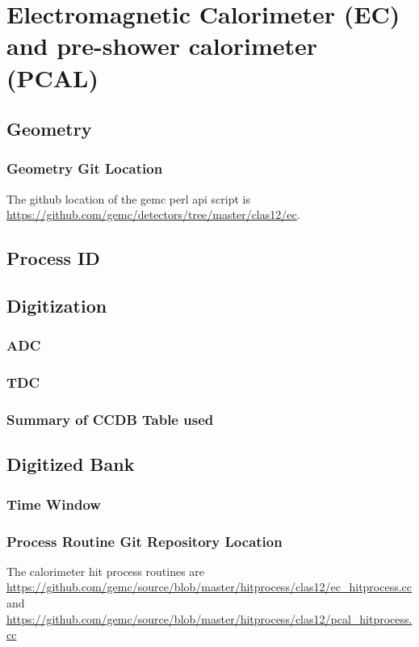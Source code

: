 \section{Electromagnetic Calorimeter (EC) and pre-shower calorimeter (PCAL)}

\subsection{Geometry}

\subsubsection{Geometry Git Location}
The github location of the gemc perl api script is \url{https://github.com/gemc/detectors/tree/master/clas12/ec}.

\subsection{Process ID}

\subsection{Digitization}


\subsubsection{ADC}
\subsubsection{TDC}

\subsubsection{Summary of CCDB Table used}

\subsection{Digitized Bank}

\subsubsection{Time Window}

\subsubsection{Process Routine Git Repository Location}

The calorimeter hit process routines are \url{https://github.com/gemc/source/blob/master/hitprocess/clas12/ec_hitprocess.cc} and
\url{https://github.com/gemc/source/blob/master/hitprocess/clas12/pcal_hitprocess.cc}

